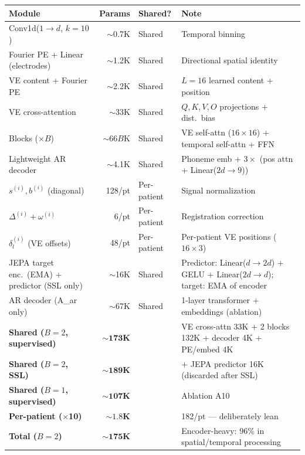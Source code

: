 \documentclass[11pt,letterpaper]{article}
\begin{document}
\begin{table}[ht!]\centering\small
\begin{tabular}{@{}lrll@{}}
\toprule
\textbf{Module} & \textbf{Params} & \textbf{Shared?} & \textbf{Note} \\
\midrule
Conv1d($1 \to d$, $k{=}10$) & ${\sim}$0.7K & Shared & Temporal binning \\
Fourier PE + Linear (electrodes) & ${\sim}$1.2K & Shared & Directional spatial identity \\
VE content + Fourier PE & ${\sim}$2.2K & Shared & $L{=}16$ learned content + position \\
VE cross-attention & ${\sim}$33K & Shared & $Q, K, V, O$ projections + dist.\ bias \\
Blocks ($\times B$) & ${\sim}$66$B$K & Shared & VE self-attn ($16 \times 16$) + temporal self-attn + FFN \\
Lightweight AR decoder & ${\sim}$4.1K & Shared & Phoneme emb + $3 \times$ (pos attn + Linear($2d \to 9$)) \\
\midrule
$s^{(i)}, b^{(i)}$ (diagonal) & 128/pt & Per-patient & Signal normalization \\
$\Delta^{(i)} + \omega^{(i)}$ & 6/pt & Per-patient & Registration correction \\
$\delta_l^{(i)}$ (VE offsets) & 48/pt & Per-patient & Per-patient VE positions ($16 \times 3$) \\
\midrule
JEPA target enc.\ (EMA) + predictor (SSL only) & ${\sim}$16K & Shared & Predictor: Linear($d{\to}2d$) + GELU + Linear($2d{\to}d$); target: EMA of encoder \\
AR decoder (A\_ar only) & ${\sim}$67K & Shared & 1-layer transformer + embeddings (ablation) \\
\midrule
\textbf{Shared ($B{=}2$, supervised)} & $\mathbf{{\sim}173}$\textbf{K} & & VE cross-attn 33K + 2 blocks 132K + decoder 4K + PE/embed 4K \\
\textbf{Shared ($B{=}2$, SSL)} & $\mathbf{{\sim}189}$\textbf{K} & & $+$ JEPA predictor 16K (discarded after SSL) \\
\textbf{Shared ($B{=}1$, supervised)} & $\mathbf{{\sim}107}$\textbf{K} & & Ablation A10 \\
\textbf{Per-patient ($\times$10)} & $\mathbf{{\sim}1.8}$\textbf{K} & & 182/pt --- deliberately lean \\
\textbf{Total ($B{=}2$)} & $\mathbf{{\sim}175}$\textbf{K} & & Encoder-heavy: 96\% in spatial/temporal processing \\
\bottomrule
\end{tabular}
\end{table}
\end{document}
